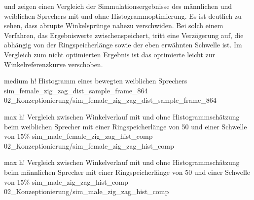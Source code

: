  und  zeigen einen Vergleich der Simmulationsergebnisse des männlichen und weiblichen Sprechers mit und ohne Histogrammoptimierung. Es ist deutlich zu sehen, dass abrupte Winkelsprünge nahezu verschwiden. Bei solch einem Verfahren, das Ergebniswerte zwischenspeichert, tritt eine Verzögerung auf, die abhängig von der Ringspeicherlänge sowie der eben erwähnten Schwelle ist. Im Vergleich zum nicht optimierten Ergebnis ist das optimierte leicht zur Winkelreferenzkurve verschoben.


         {medium}                                                       %
         {h!}                                                  %
         {Histogramm eines bewegten weiblichen Sprechers}    %
         {sim_female_zig_zag_dist_sample_frame_864}                                               %
         {02_Konzeptionierung/sim_female_zig_zag_dist_sample_frame_864} 


         {max}                                                       %
         {h!}                                                  %
         {Vergleich zwischen Winkelverlauf mit und ohne Histogrammschätzung beim weiblichen Sprecher mit einer Ringspeicherlänge von 50 und einer Schwelle von 15\%}    %
         {sim_male_female_zig_zag_hist_comp}                                               %
         {02_Konzeptionierung/sim_female_zig_zag_hist_comp} 


         {max}                                                       %
         {h!}                                                  %
         {Vergleich zwischen Winkelverlauf mit und ohne Histogrammschätzung beim männlichen Sprecher mit einer Ringspeicherlänge von 50 und einer Schwelle von 15\%}    %
         {sim_male_zig_zag_hist_comp}                                               %
         {02_Konzeptionierung/sim_male_zig_zag_hist_comp} 






